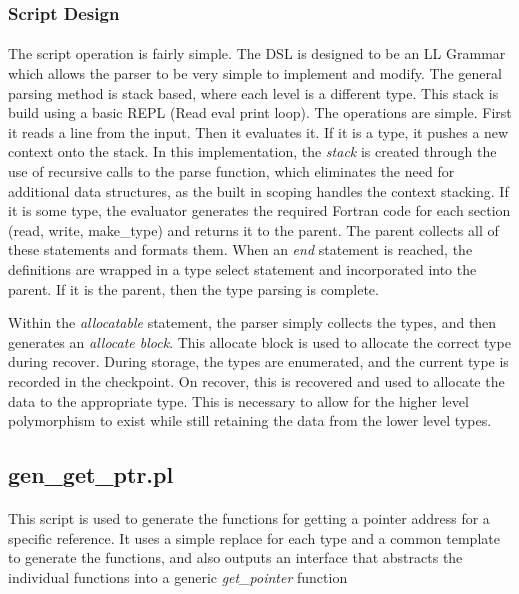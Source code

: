 \documentclass{article}
\begin{document}
\subsubsection{Script Design}
\paragraph{}
The script operation is fairly simple. The DSL is designed to be an LL Grammar which allows the parser to be very simple to implement and modify. The general parsing method is stack based, where each level is a different type. This stack is build using a basic REPL (Read eval print loop). The operations are simple. First it reads a line from the input. Then it evaluates it. If it is a type, it pushes a new context onto the stack. In this implementation, the \emph{stack} is created through the use of recursive calls to the parse function, which eliminates the need for additional data structures, as the built in scoping handles the context stacking. If it is some type, the evaluator generates the required Fortran code for each section (read, write, make\_type) and returns it to the parent. The parent collects all of these statements and formats them. When an \emph{end} statement is reached, the definitions are wrapped in a type select statement and incorporated into the parent. If it is the parent, then the type parsing is complete.

Within the \emph{allocatable} statement, the parser simply collects the types, and then generates an \emph{allocate block}. This allocate block is used to allocate the correct type during recover. During storage, the types are enumerated, and the current type is recorded in the checkpoint. On recover, this is recovered and used to allocate the data to the appropriate type. This is necessary to allow for the higher level polymorphism to exist while still retaining the data from the lower level types.

\subsection{gen\_get\_ptr.pl}
\paragraph{}
This script is used to generate the functions for getting a pointer address for a specific reference. It uses a simple replace for each type and a common template to generate the functions, and also outputs an interface that abstracts the individual functions into a generic \emph{get\_pointer} function
\end{document}
